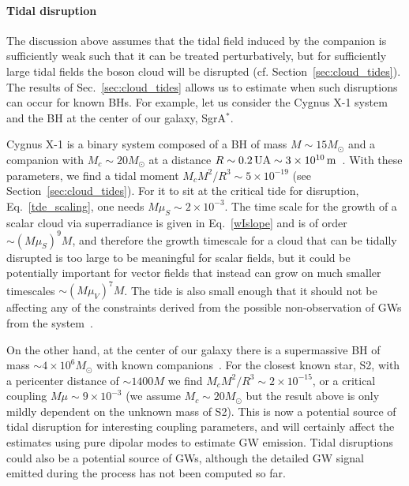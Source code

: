 \documentclass[11pt]{article}
\numberwithin{equation}{section} %
\begin{document}
\paragraph{Tidal disruption}
The discussion above assumes that the tidal field induced by the companion is sufficiently weak such that it can be treated perturbatively, but for sufficiently large tidal fields the boson cloud will be disrupted (cf. Section~\ref{sec:cloud_tides}). The results of Sec.~\ref{sec:cloud_tides} allows us to estimate when such disruptions can occur for known BHs. For example, let us consider the Cygnus X-1 system and the BH at the center of our galaxy, SgrA$^*$. 

Cygnus X-1 is a binary system composed of a BH of mass $M\sim 15 M_\odot$ and a companion with $M_c\sim 20 M_\odot$ at a distance $R\sim 0.2 \,{\rm UA} \sim 3\times 10^{10}  \,{\rm m}$~\cite{Orosz_2011}. With these parameters, we find a tidal moment $M_cM^2/R^3 \sim 5\times 10^{-19}$ (see Section~\ref{sec:cloud_tides}). For it to sit at the critical tide for disruption, Eq.~\eqref{tde_scaling}, one needs $M\mu_S\sim 2\times 10^{-3}$. The time scale for the growth of a scalar cloud via superradiance is given in Eq.~\eqref{wIslope} and is of order $\sim (M\mu_S)^9 M$, and therefore the growth timescale for a cloud that can be tidally disrupted is too large to be meaningful for scalar fields, but it could be potentially important for vector fields that instead can grow on much smaller timescales $\sim (M\mu_V)^7 M$. The tide is also small enough that it should not be affecting any of the constraints derived from the possible non-observation of GWs from the system~\cite{Yoshino:2014wwa,Sun:2019mqb}.

On the other hand, at the center of our galaxy there is a supermassive BH of mass $\sim 4\times 10^6 M_{\odot}$ with known companions~\cite{Abuter:2018drb,Naoz:2019sjx}. For the closest known star, S2, with a pericenter distance of $\sim 1400M$ we find $M_cM^2/R^3\sim 2\times 10^{-15}$, or a critical coupling $M\mu \sim 9\times 10^{-3}$ (we assume $M_c\sim 20 M_{\odot}$ but the result above is only mildly dependent on the unknown mass of S2). This is now a potential source of tidal disruption for interesting coupling parameters, and will certainly affect the estimates using pure dipolar modes to estimate GW emission.
Tidal disruptions could also be a potential source of GWs, although the detailed GW signal emitted during the process has not been computed so far.

\end{document}
